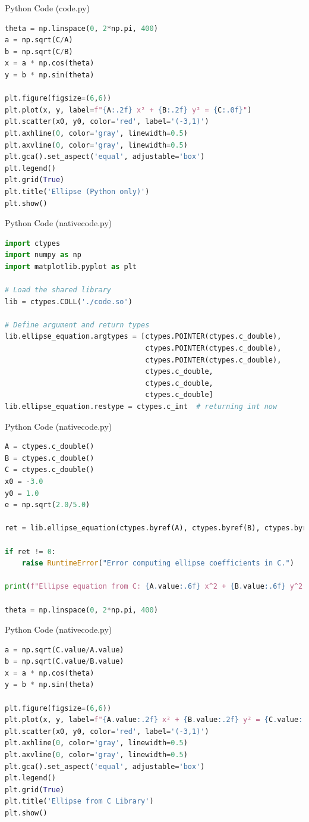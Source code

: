 \documentclass{beamer}
\begin{document}
\begin{frame}[fragile]{Python Code (code.py)}
\begin{lstlisting}[language=Python]
theta = np.linspace(0, 2*np.pi, 400)
a = np.sqrt(C/A)
b = np.sqrt(C/B)
x = a * np.cos(theta)
y = b * np.sin(theta)

plt.figure(figsize=(6,6))
plt.plot(x, y, label=f"{A:.2f} x² + {B:.2f} y² = {C:.0f}")
plt.scatter(x0, y0, color='red', label='(-3,1)')
plt.axhline(0, color='gray', linewidth=0.5)
plt.axvline(0, color='gray', linewidth=0.5)
plt.gca().set_aspect('equal', adjustable='box')
plt.legend()
plt.grid(True)
plt.title('Ellipse (Python only)')
plt.show()
\end{lstlisting}
\end{frame}
\begin{frame}[fragile]{Python Code (nativecode.py)}
\begin{lstlisting}[language=Python]
import ctypes
import numpy as np
import matplotlib.pyplot as plt

# Load the shared library
lib = ctypes.CDLL('./code.so')

# Define argument and return types
lib.ellipse_equation.argtypes = [ctypes.POINTER(ctypes.c_double),
                                 ctypes.POINTER(ctypes.c_double),
                                 ctypes.POINTER(ctypes.c_double),
                                 ctypes.c_double,
                                 ctypes.c_double,
                                 ctypes.c_double]
lib.ellipse_equation.restype = ctypes.c_int  # returning int now

\end{lstlisting}
\end{frame}
\begin{frame}[fragile]{Python Code (nativecode.py)}
\begin{lstlisting}[language=Python]
A = ctypes.c_double()
B = ctypes.c_double()
C = ctypes.c_double()
x0 = -3.0
y0 = 1.0
e = np.sqrt(2.0/5.0)

ret = lib.ellipse_equation(ctypes.byref(A), ctypes.byref(B), ctypes.byref(C), x0, y0, e)

if ret != 0:
    raise RuntimeError("Error computing ellipse coefficients in C.")

print(f"Ellipse equation from C: {A.value:.6f} x^2 + {B.value:.6f} y^2 = {C.value:.6f}")

theta = np.linspace(0, 2*np.pi, 400)
\end{lstlisting}
\end{frame}
\begin{frame}[fragile]{Python Code (nativecode.py)}
\begin{lstlisting}[language=Python]
a = np.sqrt(C.value/A.value)
b = np.sqrt(C.value/B.value)
x = a * np.cos(theta)
y = b * np.sin(theta)

plt.figure(figsize=(6,6))
plt.plot(x, y, label=f"{A.value:.2f} x² + {B.value:.2f} y² = {C.value:.0f}")
plt.scatter(x0, y0, color='red', label='(-3,1)')
plt.axhline(0, color='gray', linewidth=0.5)
plt.axvline(0, color='gray', linewidth=0.5)
plt.gca().set_aspect('equal', adjustable='box')
plt.legend()
plt.grid(True)
plt.title('Ellipse from C Library')
plt.show()
\end{lstlisting}
\end{frame}
\end{document}

